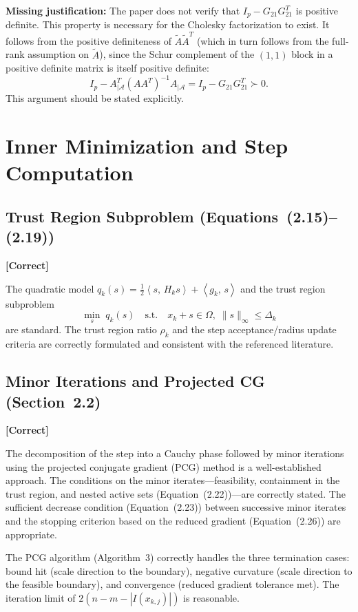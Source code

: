 \documentclass[11pt]{article}
\newcommand{\calA}{\mathcal{A}}
\newcommand{\inner}[2]{\left\langle #1,\, #2 \right\rangle}
\newcommand{\statusok}{\textcolor{okcolor}{\textbf{[Correct]}}}
\theoremstyle{plain}
\begin{document}
\medskip\noindent
\textcolor{warncolor}{\textbf{Missing justification:}} The paper does not verify that $I_p - G_{21}G_{21}^T$ is positive definite. This property is necessary for the Cholesky factorization to exist. It follows from the positive definiteness of $\tilde{A}\tilde{A}^T$ (which in turn follows from the full-rank assumption on $\tilde{A}$), since the Schur complement of the $(1,1)$ block in a positive definite matrix is itself positive definite:
\[
I_p - A_{|\calA}^T(AA^T)^{-1}A_{|\calA} = I_p - G_{21}G_{21}^T \succ 0.
\]
This argument should be stated explicitly.

\section{Inner Minimization and Step Computation}

\subsection{Trust Region Subproblem (Equations~(2.15)--(2.19))}
\statusok

The quadratic model $q_k(s) = \frac{1}{2}\inner{s}{H_ks} + \inner{g_k}{s}$ and the trust region subproblem
\[
\min_s\; q_k(s) \quad\text{s.t.}\quad x_k + s \in \Omega,\;\|s\|_\infty \le \Delta_k
\]
are standard. The trust region ratio $\rho_k$ and the step acceptance/radius update criteria are correctly formulated and consistent with the referenced literature.

\subsection{Minor Iterations and Projected CG (Section~2.2)}
\statusok

The decomposition of the step into a Cauchy phase followed by minor iterations using the projected conjugate gradient (PCG) method is a well-established approach. The conditions on the minor iterates---feasibility, containment in the trust region, and nested active sets (Equation~(2.22))---are correctly stated. The sufficient decrease condition (Equation~(2.23)) between successive minor iterates and the stopping criterion based on the reduced gradient (Equation~(2.26)) are appropriate.

The PCG algorithm (Algorithm~3) correctly handles the three termination cases: bound hit (scale direction to the boundary), negative curvature (scale direction to the feasible boundary), and convergence (reduced gradient tolerance met). The iteration limit of $2(n - m - |I(x_{k,j})|)$ is reasonable.
\end{document}
